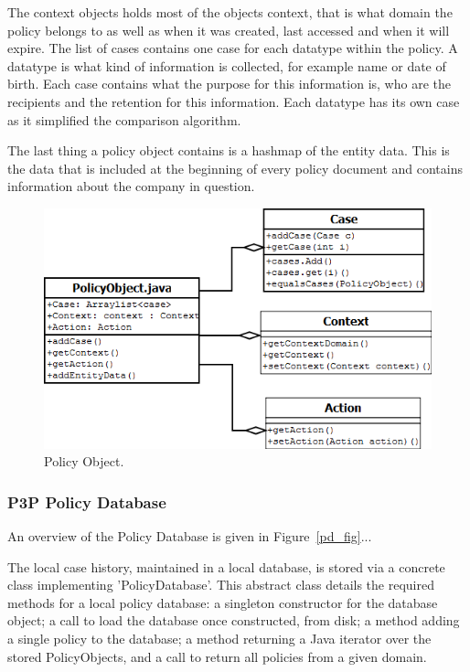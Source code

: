 The context objects holds most of the objects context, that is what domain the policy belongs to as well as when it was created, last accessed and when it will expire. The list of cases contains one case for each datatype within the policy. A datatype is what kind of information is collected, for example name or date of birth. Each case contains what the purpose for this information is, who are the recipients and the retention for this information. Each datatype has its own case as it simplified the comparison algorithm.

The last thing a policy object contains is a hashmap of the entity data. This is the data that is included at the beginning of every policy document and contains information about the company in question.

\begin{figure}[htbp]
\begin{center}
\includegraphics[width = \textwidth]{DesignReport/uml/po.png}
\caption{Policy Object.}
\label{po_fig}
\end{center}
\end{figure}

\subsubsection{P3P Policy Database}

An overview of the Policy Database is given in Figure~\ref{pd_fig}...

The local case history, maintained in a local database, is stored via a concrete class implementing 'PolicyDatabase'. This abstract class details the required methods for a local policy database: a singleton constructor for the database object; a call to load the database once constructed, from disk; a method adding a single policy to the database; a method returning a Java iterator over the stored PolicyObjects, and a call to return all policies from a given domain.

